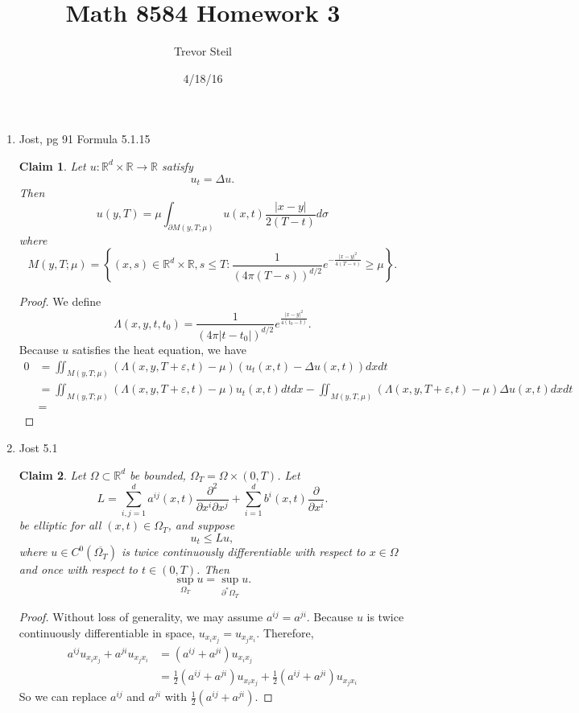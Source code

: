 \documentclass[a4paper]{article}
\title{Math 8584 Homework 3 }
\date{4/18/16}
\author{Trevor Steil}
\newtheorem*{claim}{Claim}
\newcommand{\R}{\mathbb{R}}
\begin{document}
\maketitle
\begin{enumerate}
  \item Jost, pg 91 Formula 5.1.15
    \begin{claim}
      Let $u: \R^d \times \R \to \R$ satisfy
      \begin{equation*}
        u_t = \Delta u.
      \end{equation*}
      Then
      \[ u(y,T) = \mu \int_{\partial M(y, T; \mu)}^{} u(x,t) \frac{|x-y|}{2(T-t)} d \sigma \]
      where
      \[ M(y,T; \mu) = \left\{ (x,s) \in \R^d \times \R, s \leq T : \frac{1}{(4 \pi (T-s))^{d/2}} e^{-\frac{|x-y|^2}{4(T-s)} } \geq \mu \right\} .\]
    \end{claim}

    \begin{proof}
      We define
      \[ \Lambda(x,y,t,t_0) = \frac{1}{(4 \pi |t-t_0|)^{d/2}} e^{\frac{|x-y|^2}{4(t_0 - t)} } .\]
      Because $u$ satisfies the heat equation, we have
      \begin{align*}
        0 &= \iint_{M(y,T;\mu)}^{} ( \Lambda(x,y,T+\varepsilon,t) - \mu) (u_t (x,t) - \Delta u(x,t)) dx dt \\
        &= \iint_{M(y,T;\mu)}^{} ( \Lambda(x,y,T+\varepsilon,t) - \mu ) u_t(x,t) dt dx
        - \iint_{M(y,T,\mu)}^{} ( \Lambda(x,y,T+\varepsilon,t) - \mu ) \Delta u(x,t) dx dt \\
        &=
      \end{align*}
    \end{proof}

  \item Jost 5.1
    \begin{claim}
      Let $\Omega \subset \R^d$ be bounded, $\Omega_T = \Omega \times (0,T)$. Let
      \[ L = \sum_{i,j=1}^d a^{ij}(x,t) \frac{\partial^2}{\partial x^i \partial x^j} + \sum_{i=1}^d b^i(x,t) \frac{\partial}{\partial x^i} .\]
      be elliptic for all $(x,t) \in \Omega_T$, and suppose
      \[ u_t \leq Lu, \]
      where $u \in C^0(\overline{\Omega_T})$ is twice continuously differentiable with respect to $x \in \Omega$ and once with respect to $t \in
      (0,T)$. Then
      \[ \sup_{\Omega_T} u = \sup_{\partial^\ast \Omega_T} u. \]
    \end{claim}

    \begin{proof}
      Without loss of generality, we may assume $a^{ij} = a^{ji}$. Because $u$ is twice continuously differentiable in space, $u_{x_i x_j} = u_{x_j
      x_i}$. Therefore,
      \begin{align*}
        a^{ij} u_{x_i x_j} + a^{ji} u_{x_j x_i} &= (a^{ij} + a^{ji}) u_{x_i x_j} \\
        &= \frac{1}{2} (a^{ij} + a^{ji}) u_{x_i x_j} + \frac{1}{2} (a^{ij} + a^{ji}) u_{x_j x_i}
      \end{align*}
      So we can replace $a^{ij}$ and $a^{ji}$ with $\frac{1}{2} (a^{ij} + a^{ji})$.


\end{proof}
\end{enumerate}
\end{document}
